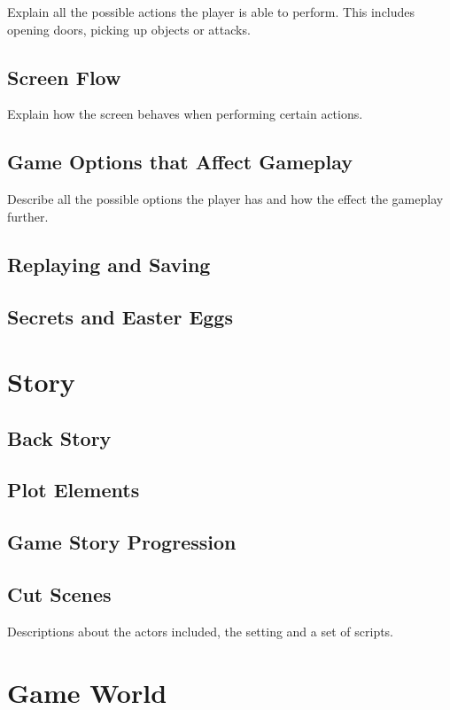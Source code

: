 \documentclass[12pt]{article}
\begin{document}
Explain all the possible actions the player is able to perform. This includes opening doors, picking up objects or attacks.

\subsection{Screen Flow}

Explain how the screen behaves when performing certain actions.

\subsection{Game Options that Affect Gameplay}

Describe all the possible options the player has and how the effect the gameplay further. 

\subsection{Replaying and Saving}

\subsection{Secrets and Easter Eggs}

\section{Story}

\subsection{Back Story}

\subsection{Plot Elements}

\subsection{Game Story Progression}

\subsection{Cut Scenes}

Descriptions about the actors included, the setting and a set of scripts.

\section{Game World}
\end{document}
